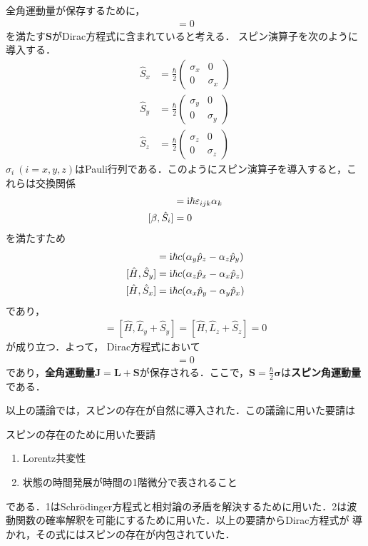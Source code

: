 \documentclass{report}
\begin{document}
  全角運動量が保存するために，
  \begin{align}
    [\hat{H}, \hat{\bm{L}} + \hat{\bm{S}}] = 0
  \end{align}
  を満たす$\bm{S}$がDirac方程式に含まれていると考える．
  スピン演算子を次のように導入する．
  \begin{align}
    \hat{S}_x &= \frac{\hbar}{2}
    \begin{pmatrix}
      \sigma_x & 0\\
      0& \sigma_x
    \end{pmatrix}\\
    \hat{S}_y &= \frac{\hbar}{2}
    \begin{pmatrix}
      \sigma_y & 0\\
      0& \sigma_y
    \end{pmatrix}\\
    \hat{S}_z &= \frac{\hbar}{2}
    \begin{pmatrix}
      \sigma_z & 0\\
      0& \sigma_z
    \end{pmatrix}
  \end{align}
  $\sigma_i\ (i=x,y,z)$はPauli行列である．このようにスピン演算子を導入すると，これらは交換関係
  \begin{align}
    [\alpha_i, \hat{S}_j] &= \i \hbar \epsilon_{ijk} \alpha_k\\
    [\beta, \hat{S}_i] &= 0
  \end{align}
  を満たすため
  \begin{align}
    [\hat{H}, \hat{S}_x] &= \i\hbar c(\alpha_y \hat{p}_z - \alpha_z \hat{p}_y)\\
    [\hat{H}, \hat{S}_y] &= \i\hbar c(\alpha_z \hat{p}_x - \alpha_x \hat{p}_z)\\
    [\hat{H}, \hat{S}_x] &= \i\hbar c(\alpha_x \hat{p}_y - \alpha_y \hat{p}_x)
  \end{align}
  であり，
  \begin{align}
    [\hat{H}, \hat{L}_x + \hat{S}_x] = [\hat{H}, \hat{L}_y + \hat{S}_y] = [\hat{H}, \hat{L}_z + \hat{S}_z] = 0
  \end{align}
  が成り立つ．よって，
  Dirac方程式において
  \begin{align}
    [\hat{H}, \hat{\bm{L}} + \hat{\bm{S}}] = 0
  \end{align}
  であり，\textbf{全角運動量}$\bm{J} = \bm{L} + \bm{S}$が保存される．ここで，$\bm{S} = \frac{\hbar}{2}\bm{\sigma}$は\textbf{スピン角運動量}である．

  以上の議論では，スピンの存在が自然に導入された．この議論に用いた要請は
  \begin{itembox}[l]{スピンの存在のために用いた要請}
  \begin{enumerate}
    \item Lorentz共変性
    \item 状態の時間発展が時間の1階微分で表されること
  \end{enumerate}
  \end{itembox}
  である．1はSchrödinger方程式と相対論の矛盾を解決するために用いた．2は波動関数の確率解釈を可能にするために用いた．以上の要請からDirac方程式が
  導かれ，その式にはスピンの存在が内包されていた．
\end{document}

